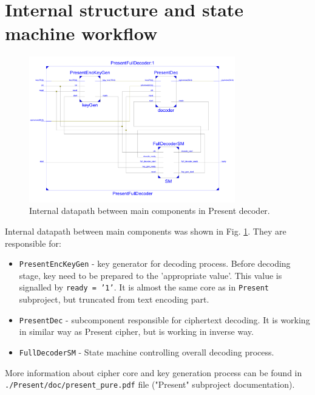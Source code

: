 \documentclass{gajewski}
\begin{document}
\newpage

\section{Internal structure and state machine workflow}

\begin{figure}[!ht]%
    \begin{center}
    \includegraphics[width=0.8\textwidth]{img/internalStructure.png}
    \caption{%
        Internal datapath between main components in Present decoder.
     }%
    \label{internalStructure}
    \end{center}
 \end{figure}

Internal datapath between main components was shown in Fig. \ref{internalStructure}. They are responsible for:

\begin{itemize}
    \item \texttt{PresentEncKeyGen} - key generator for decoding process. Before decoding stage, key need to be prepared to the 'appropriate value'. This value is signalled by \texttt{ready = '1'}. It is almost the same core as in \texttt{Present} subproject, but truncated from text encoding part.
    \item \texttt{PresentDec} - subcomponent responsible for ciphertext decoding. It is working in similar way as Present cipher, but is working in inverse way.
    \item \texttt{FullDecoderSM} - State machine controlling overall decoding process.
\end{itemize}

More information about cipher core and key generation process can be found in \\ \texttt{./Present/doc/present\_pure.pdf} file ("Present" subproject documentation).
\end{document}
